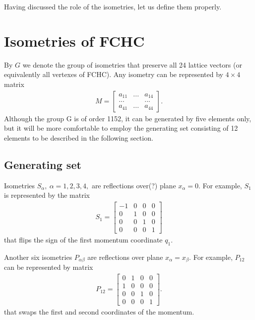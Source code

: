 Having discussed the role of the isometries, let us define them properly.

\section{Isometries of FCHC} 

By $G$ we denote the group of isometries that preserve all 24 lattice vectors (or equivalently all vertexes of FCHC). Any isometry can be represented by $4 \times 4$ matrix
\begin{align}
M = 
\begin{bmatrix}
a_{11} & ... & a_{14} \\
... & & ... \\
a_{41} & ... & a_{44}
\end{bmatrix}.
\end{align}
Although the group G is of order 1152, it can be generated by five elements only,
but it will be more comfortable to employ the generating set consisting of 12 elements to be described in the following section.

\subsection{Generating set}
Isometries $S_{\alpha},~\alpha=1,2,3,4,$ are reflections over(?) plane $x_{\alpha} = 0$.
For example, $S_{1}$ is represented by the matrix
\begin{align}
S_1 = 
\left[\begin{array}{rrrr}
-1 & 0 & 0 & 0 \\
 0 & 1 & 0 & 0 \\
 0 & 0 & 1 & 0 \\
 0 & 0 & 0 & 1
\end{array}\right]
\end{align} 
that flips the sign of the first momentum coordinate $q_{1}$.

\bigskip

Another six isometries $P_{\alpha \beta}$ are reflections over plane $x_{\alpha} = x_{\beta}$.
For example, $P_{12}$ can be represented by matrix
\begin{align}
P_{12} =
\begin{bmatrix}
0 & 1 & 0 & 0 \\
1 & 0 & 0 & 0 \\
0 & 0 & 1 & 0 \\
0 & 0 & 0 & 1
\end{bmatrix}.
\end{align}
that swaps the first and second coordinates of the momentum.

